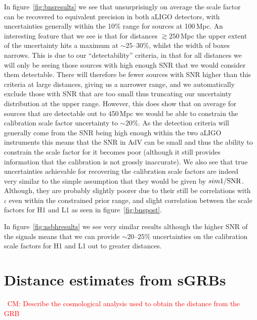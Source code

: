 \documentclass[10pt]{iopart}
\newcommand{\cm}[1]{\textcolor{red}{CM: #1}}
\begin{document}
In figure~\ref{fig:bnsresults} we see that unsurprisingly on average the scale factor can be 
recovered to equivalent precision in both \ac{aLIGO} detectors, with uncertainties generally within 
the 10\% range for sources at 100\,Mpc. An interesting feature that we see is that for distances 
$\gtrsim 250$\,Mpc the upper extent of the uncertainty hits a maximum at $\sim 25\mbox{--}30\%$, 
whilst the width of boxes narrows. This is due to our ``detectability'' criteria, in that for all 
distances we will only be seeing those sources with high enough SNR that we would consider them 
detectable. There will therefore be fewer sources with SNR higher than this criteria at large 
distances, giving us a narrower range, and we automatically exclude those with SNR that are too 
small thus truncating our uncertainty distribution at the upper range. However, this does show that 
on average for sources that are detectable out to 450\,Mpc we would be able to constrain the 
calibration scale factor uncertainty to $\sim 20\%$. As the detection criteria will generally come 
from the SNR being high enough within the two \ac{aLIGO} instruments this means that the SNR in 
\ac{AdV} can be small and thus the ability to constrain the scale factor for it becomes poor 
(although it still provides information that the calibration is not grossly inaccurate). We also 
see that true uncertainties achievable for recovering the calibration scale factors are indeed very 
similar to the simple assumption that they would be given by $sim 1/{\rm SNR}$. Although, they are 
probably slightly poorer due to their still be correlations with $\iota$ even within the 
constrained prior range, and slight correlation between the scale factors for H1 and L1 as seen in 
figure~\ref{fig:bnspost}.

In figure~\ref{fig:nsbhresults} we see very similar results although the higher \ac{SNR} of the 
signals means that we can provide $\sim 20\mbox{--}25\%$ uncertainties on the calibration scale 
factors for H1 and L1 out to greater distances.

\section{Distance estimates from \acp{sGRB}\label{sec:cosmo}}

~\cm{Describe the cosmological analysis used to obtain the distance from the
GRB}

\end{document}
